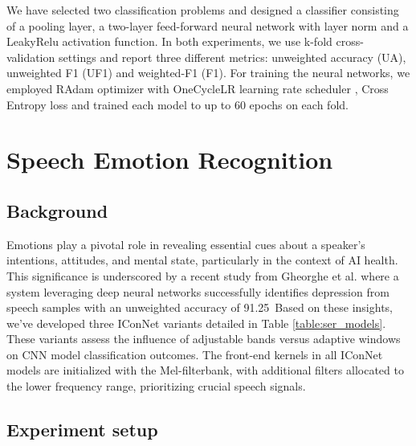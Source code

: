 We have selected two classification problems and designed a classifier consisting of a pooling layer, a two-layer feed-forward neural network with layer norm and a LeakyRelu activation function. In both experiments, we use k-fold cross-validation settings and report three different metrics: unweighted accuracy (UA), unweighted F1 (UF1) and weighted-F1 (F1). For training the neural networks, we employed RAdam optimizer \cite{liu2019radam} with OneCycleLR learning rate scheduler \cite{smith2017onecyclelr}, Cross Entropy loss and trained each model to up to 60 epochs on each fold.



\section{Speech Emotion Recognition} 
\label{sec:ser}

\subsection{Background}
Emotions play a pivotal role in revealing essential cues about a speaker's intentions, attitudes, and mental state, particularly in the context of AI health. This significance is underscored by a recent study from Gheorghe et al. \cite{gheorghe2023dnn_depression} where a system leveraging deep neural networks successfully identifies depression from speech samples with an unweighted accuracy of 91.25\
Based on these insights, we've developed three IConNet variants detailed in Table \ref{table:ser_models}. These variants assess the influence of adjustable bands versus adaptive windows on CNN model classification outcomes. The front-end kernels in all IConNet models are initialized with the Mel-filterbank, with additional filters allocated to the lower frequency range, prioritizing crucial speech signals.


\subsection{Experiment setup}

